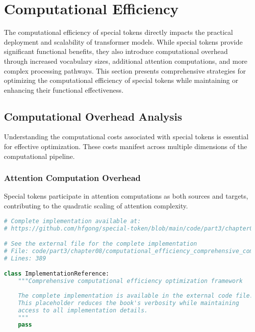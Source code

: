 
\section{Computational Efficiency}

The computational efficiency of special tokens directly impacts the practical deployment and scalability of transformer models. While special tokens provide significant functional benefits, they also introduce computational overhead through increased vocabulary sizes, additional attention computations, and more complex processing pathways. This section presents comprehensive strategies for optimizing the computational efficiency of special tokens while maintaining or enhancing their functional effectiveness.

\subsection{Computational Overhead Analysis}

Understanding the computational costs associated with special tokens is essential for effective optimization. These costs manifest across multiple dimensions of the computational pipeline.

\subsubsection{Attention Computation Overhead}

Special tokens participate in attention computations as both sources and targets, contributing to the quadratic scaling of attention complexity.

\begin{lstlisting}[language=Python, caption={Comprehensive computational efficiency optimization framework}]
# Complete implementation available at:
# https://github.com/hfgong/special-token/blob/main/code/part3/chapter08/computational_efficiency_comprehensive_computational_ef.py

# See the external file for the complete implementation
# File: code/part3/chapter08/computational_efficiency_comprehensive_computational_ef.py
# Lines: 389

class ImplementationReference:
    """Comprehensive computational efficiency optimization framework
    
    The complete implementation is available in the external code file.
    This placeholder reduces the book's verbosity while maintaining
    access to all implementation details.
    """
    pass
\end{lstlisting}